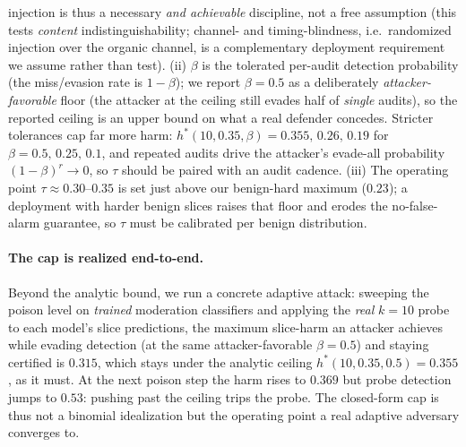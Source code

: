 \documentclass[conference]{IEEEtran}
\begin{document}
injection is thus a necessary \emph{and achievable} discipline, not a free assumption (this tests
\emph{content} indistinguishability; channel- and timing-blindness, i.e.\ randomized injection over the organic
channel, is a complementary deployment requirement we assume rather than test). (ii) $\beta$ is the tolerated per-audit
detection probability (the miss/evasion rate is $1-\beta$); we report $\beta{=}0.5$ as a deliberately
\emph{attacker-favorable} floor (the attacker at
the ceiling still evades half of \emph{single} audits), so the reported ceiling is an upper bound on what a
real defender concedes. Stricter tolerances cap far more harm: $h^*(10,0.35,\beta)=0.355,\,0.26,\,0.19$ for
$\beta=0.5,\,0.25,\,0.1$, and repeated audits drive the attacker's evade-all probability $(1-\beta)^r\to 0$, so $\tau$ should be
paired with an audit cadence. (iii) The operating point $\tau \approx 0.30$--$0.35$ is set
just above our benign-hard maximum ($0.23$); a deployment with harder benign slices raises that floor and
erodes the no-false-alarm guarantee, so $\tau$ must be calibrated per benign distribution.

\paragraph{The cap is realized end-to-end.} Beyond the analytic bound, we run a concrete adaptive attack:
sweeping the poison level on \emph{trained} moderation classifiers and applying the \emph{real} $k{=}10$ probe
to each model's slice predictions, the maximum slice-harm an attacker achieves while evading detection
(at the same attacker-favorable $\beta{=}0.5$) and staying certified is $0.315$, which stays under the analytic
ceiling $h^*(10,0.35,0.5)=0.355$, as it must. At the
next poison step the harm rises to $0.369$ but probe detection jumps to $0.53$: pushing past the ceiling trips
the probe. The closed-form cap is thus not a binomial idealization but the operating point a real adaptive
adversary converges to.
\end{document}
